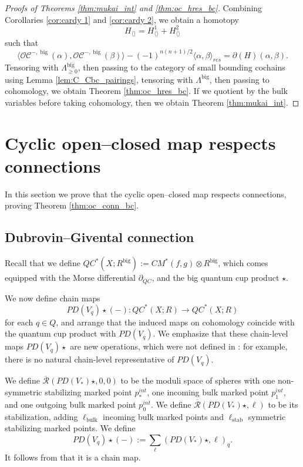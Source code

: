 \documentclass{article}
\def\cO{\mathcal{O}}
\def\cC{\mathcal{C}}
\def\Rbar{\overline{\mathcal{R}}}
\def\stab{\mathrm{stab}}
\def\big{{\operatorname{big}}}
\def\signn{{n(n+1)/2}}
\def\bulk{{\operatorname{bulk}}}
\begin{document}
\begin{proof}[Proofs of Theorems \ref{thm:mukai_int} and \ref{thm:oc_hres_bc}]
    Combining Corollaries \ref{cor:cardy 1} and \ref{cor:cardy 2}, we obtain a homotopy
    $$H_{\langle \rangle} = H^1_{\langle \rangle} + H^2_{\langle \rangle}$$
    such that
    $$\langle \cO\cC^{-,\big}(\alpha),\cO\cC^{-,\big}(\beta) \rangle - (-1)^\signn\langle \alpha,\beta \rangle_{res} = \partial ( H)(\alpha,\beta).$$
    Tensoring with $\Lambda^\big_{\ge 0}$, then passing to the category of small bounding cochains using Lemma \ref{lem:C_Cbc_pairings}, tensoring with $\Lambda^\big$, then passing to cohomology, we obtain Theorem \ref{thm:oc_hres_bc}. 
    If we quotient by the bulk variables before taking cohomology, then we obtain Theorem \ref{thm:mukai_int}.
\end{proof}

\section{Cyclic open--closed map respects connections}\label{sec:oc conn}

In this section we prove that the cyclic open--closed map respects connections, proving Theorem \ref{thm:oc_conn_bc}.

\subsection{Dubrovin--Givental connection}\label{sec:pdvq}

Recall that we define $QC^*(X;R^\big) := CM^*(f,g) \otimes R^\big$, which comes equipped with the Morse differential $\partial_{QC}$, and the big quantum cup product $\star$.  

We now define chain maps
$$PD(V_q) \star (-): QC^*(X;R) \to QC^*(X;R)$$
for each $q \in Q$, and arrange that the induced maps on cohomology coincide with the quantum cup product with $PD(V_q)$. 
We emphasize that these chain-level maps $PD(V_q) \star$ are new operations, which were not defined in \cite{relfukii}: for example, there is no natural chain-level representative of $PD(V_q)$. 

We define $\Rbar(PD(V_*) \star,0,0)$ to be the moduli space of spheres with one non-symmetric stabilizing marked point $p_*^{int}$, one incoming bulk marked point $p_1^{int}$, and one outgoing bulk marked point $p_0^{int}$. 
We define $\Rbar(PD(V_*)\star,\ell)$ to be its stabilization, adding $\ell_\bulk$ incoming bulk marked points and $\ell_\stab$ symmetric stabilizing marked points. 
We define 
$$PD(V_q) \star (-):= \sum_{\ell} (PD(V_*) \star,\ell)_{q}.$$
It follows from \cite[Lemma 4.18]{relfukii} that it is a chain map.
\end{document}
